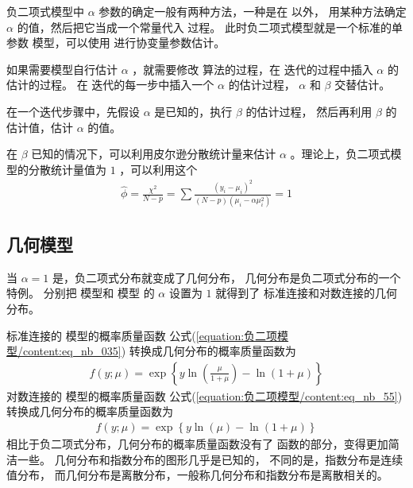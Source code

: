 \documentclass[letterpaper,10pt,english]{sphinxmanual}
\begin{document}
负二项式模型中 \(\alpha\) 参数的确定一般有两种方法，一种是在  以外，
用某种方法确定 \(\alpha\) 的值，然后把它当成一个常量代入  过程。
此时负二项式模型就是一个标准的单参数  模型，可以使用  进行协变量参数估计。

如果需要模型自行估计 \(\alpha\)
，就需要修改  算法的过程，在  迭代的过程中插入 \(\alpha\) 的估计的过程。
在  迭代的每一步中插入一个 \(\alpha\) 的估计过程，
\(\alpha\) 和 \(\beta\) 交替估计。

在一个迭代步骤中，先假设 \(\alpha\) 是已知的，执行 \(\beta\) 的估计过程，
然后再利用 \(\beta\) 的估计值，估计 \(\alpha\) 的值。

在 \(\beta\)  已知的情况下，可以利用皮尔逊分散统计量来估计 \(\alpha\)
。理论上，负二项式模型的分散统计量值为 \(1\)
，可以利用这个
\begin{equation}\label{equation:负二项模型/content:负二项模型/content:24}
\begin{split}\hat{\phi}=\frac{\chi^2}{N-p}
= \sum \frac{(y_i-\mu_i)^2}{(N-p)(\mu_i - \alpha \mu^2_i)}
= 1\end{split}
\end{equation}

\subsection{几何模型}
\label{\detokenize{_u8d1f_u4e8c_u9879_u6a21_u578b/content:id11}}
当 \(\alpha=1\) 是，负二项式分布就变成了几何分布，
几何分布是负二项式分布的一个特例。
分别把  模型和  模型
的 \(\alpha\) 设置为 \(1\) 就得到了
标准连接和对数连接的几何分布。

标准连接的  模型的概率质量函数 公式(\ref{equation:负二项模型/content:eq_nb_035})
转换成几何分布的概率质量函数为
\begin{equation}\label{equation:负二项模型/content:eq_nb_55}
\begin{split}f(y;\mu)
= \exp \left \{
y \ln  \left (\frac{\mu}{1+\mu}  \right  )-  \ln (1+\mu)
\right \}\end{split}
\end{equation}
对数连接的  模型的概率质量函数 公式(\ref{equation:负二项模型/content:eq_nb_55})
转换成几何分布的概率质量函数为
\begin{equation}\label{equation:负二项模型/content:eq_nb_56}
\begin{split}f(y;\mu)
= \exp \left \{
y \ln  ( \mu  )-  \ln (1+\mu)
\right \}\end{split}
\end{equation}
相比于负二项式分布，几何分布的概率质量函数没有了 
函数的部分，变得更加简洁一些。
几何分布和指数分布的图形几乎是已知的，
不同的是，指数分布是连续值分布，
而几何分布是离散分布，一般称几何分布和指数分布是离散相关的。
\end{document}
